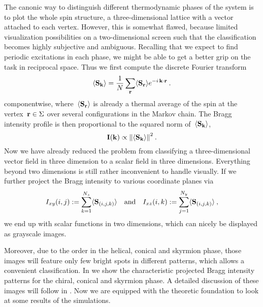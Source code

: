 The canonic way to distinguish different thermodynamic phases of the system is
to plot the whole spin structure, \ie{} a three-dimensional lattice with a
vector attached to each vertex. However, this is somewhat flawed, because
limited visualization possibilities on a two-dimensional screen such that the
classification becomes highly subjective and ambiguous. Recalling that we expect
to find periodic excitations in each phase, we might be able to get a better
grip on the task in reciprocal space. Thus we first compute the discrete Fourier
transform
%
\begin{equation}
  \langle \mathbf{S}_{\mathbf{k}} \rangle = \frac{1}{N} \sum_{\mathbf{r}} \langle \mathbf{S}_{\mathbf{r}} \rangle e^{- i\, \mathbf{k} \cdot \mathbf{r}}\:.
\end{equation}
%
componentwise, where~$\langle \mathbf{S}_{\mathbf{r}} \rangle$ is already a thermal average of the spin at
the vertex~$\mathbf{r} \in \Sigma$ over several configurations in the Markov chain. The
Bragg intensity profile is then proportional to the squared norm
of~$\langle \mathbf{S}_{\mathbf{k}} \rangle$,
%
\begin{equation}
  \mathbf{I}(\k) \propto \norm{\avg{\S_{\k}}}^2 \:.
\end{equation}
%
Now we have already reduced the problem from classifying a three-dimensional
vector field in three dimension to a scalar field in three dimensions.
Everything beyond two dimensions is still rather inconvenient to handle
visually. If we further project the Bragg intensity to various coordinate planes
via
%
\begin{equation}\label{braggproj}
  I_{xy} (i,j) := \sum_{k = 1}^{N_z} \langle \mathbf{S}_{(i,j,k)} \rangle \quad\text{and}\quad
  I_{xz} (i,k) := \sum_{j = 1}^{N_y} \langle \mathbf{S}_{(i,j,k)} \rangle\:,
\end{equation}
%
we end up with scalar functions in two dimensions, which can nicely be displayed
as grayscale images.

Moreover, due to the order in the helical, conical and skyrmion phase, those
images will feature only few bright spots in different patterns, which allows a
convenient classification. In  we show the characteristic
projected Bragg intensity patterns for the chiral, conical and skyrmion phase. A
detailed discussion of these images will follow in .  Now we
are equipped with the theoretic foundation to look at some results of the
simulations.
